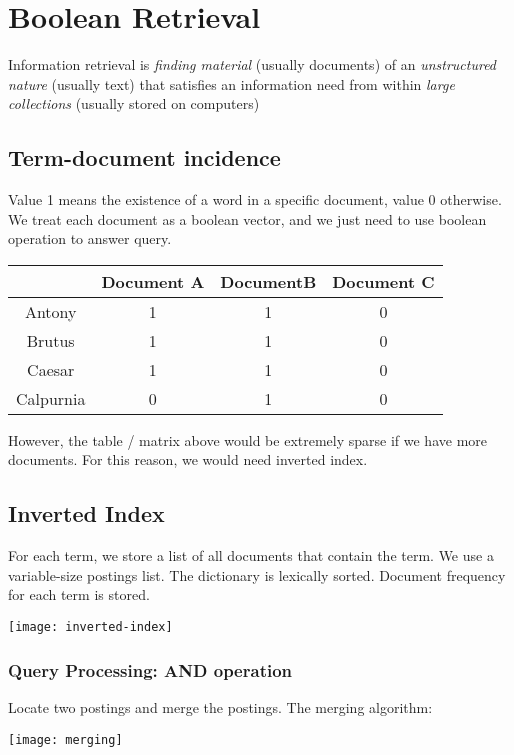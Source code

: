 \chapter{Boolean Retrieval}

\begin{multicols*}{2}

\noindent Information retrieval is \textit{finding material} (usually documents) of an \textit{unstructured nature} (usually text) that satisfies an information need from within \textit{large collections} (usually stored on computers)

\section{Term-document incidence}
\noindent Value 1 means the existence of a word in a specific document, value 0 otherwise. We treat each document as a boolean vector, and we just need to use boolean operation to answer query. 

\begin{center}
\begin{tabular}{ |c|c|c|c| } 
    \hline
     & Document A & DocumentB & Document C \\
    \hline 
    Antony & 1 & 1 & 0 \\ 
    Brutus & 1 & 1 & 0 \\
    Caesar & 1 & 1 & 0 \\
    Calpurnia & 0 & 1 & 0 \\ 
    \hline
\end{tabular}
\end{center}

\noindent However, the table / matrix above would be extremely sparse if we have more documents. For this reason, we would need inverted index.

\section{Inverted Index}
\noindent For each term, we store a list of all documents that contain the term. We use a variable-size postings list. The dictionary is lexically sorted. Document frequency for each term is stored.

\begin{center}
\texttt{[image: inverted-index]}
\end{center}

\subsection{Query Processing: AND operation}
Locate two postings and merge the postings. The merging algorithm:
\begin{center}
\texttt{[image: merging]}
\end{center}


\end{multicols*}
